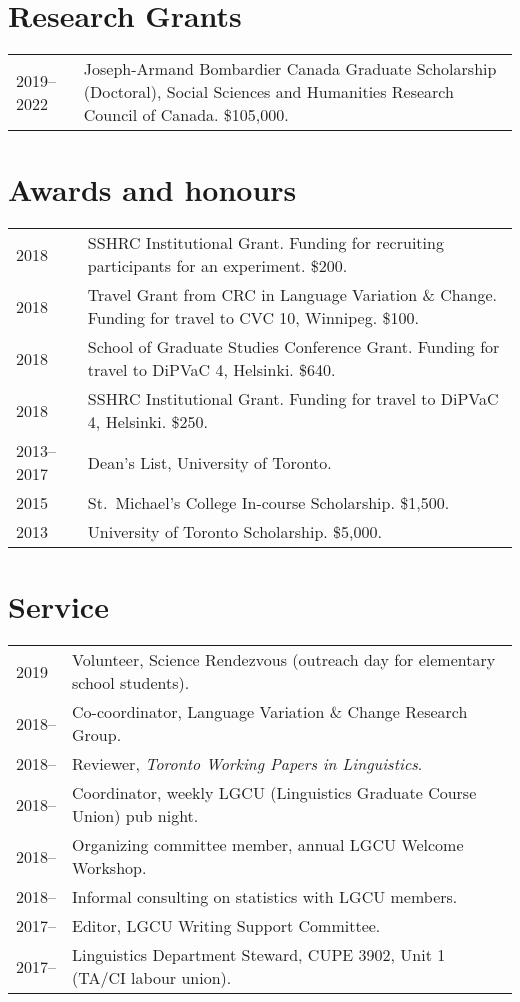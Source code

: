 \documentclass[letterpaper]{article}
\begin{document}
\section*{Research Grants}
\begin{tabular}{p{}p{}}
    2019--2022 & Joseph-Armand Bombardier Canada Graduate Scholarship
    (Doctoral), Social Sciences and Humanities Research Council of Canada.
    \$105,000. \\
\end{tabular}

\section*{Awards and honours}
\begin{tabular}{p{}p{}}
    2018 & SSHRC Institutional Grant. Funding for recruiting participants for an
    experiment. \$200. \\
    2018 & Travel Grant from CRC in Language Variation \& Change.  Funding for
    travel to CVC 10, Winnipeg. \$100. \\
    2018 & School of Graduate Studies Conference Grant. Funding for travel to
    DiPVaC 4, Helsinki. \$640. \\
    2018 & SSHRC Institutional Grant. Funding for travel to DiPVaC 4, Helsinki.
    \$250. \\
    2013--2017 & Dean's List, University of Toronto. \\
    2015 & St.\ Michael's College In-course Scholarship. \$1,500. \\
    2013 & University of Toronto Scholarship. \$5,000. \\
\end{tabular}

\section*{Service}
\begin{tabular}{p{}p{}}
    2019   & Volunteer, Science Rendezvous (outreach day for elementary school
    students). \\
    2018-- & Co-coordinator, Language Variation \& Change Research Group. \\
    2018-- & Reviewer, \textit{Toronto Working Papers in Linguistics}. \\
    2018-- & Coordinator, weekly LGCU (Linguistics Graduate Course Union) pub
    night. \\
    2018-- & Organizing committee member, annual LGCU Welcome Workshop. \\
    2018-- & Informal consulting on statistics with LGCU members. \\
    2017-- & Editor, LGCU Writing Support Committee. \\
    2017-- & Linguistics Department Steward, CUPE 3902, Unit 1 (TA/CI labour
    union). \\
\end{tabular}
\end{document}
